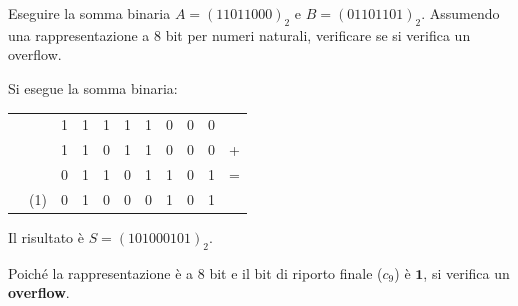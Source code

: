 \begin{Exercise}[label={ex:somma_overflow}]
    Eseguire la somma binaria $A = (11011000)_{2}$ e $B = (01101101)_{2}$. Assumendo una rappresentazione a 8 bit per numeri naturali, verificare se si verifica un overflow.
\end{Exercise}

\begin{Answer}[ref={ex:somma_overflow}]
    Si esegue la somma binaria:
    \begin{table}[H]
    \centering
    \begin{tabular}{ccccccccccc}
            &      & 1 & 1 & 1 & 1 & 1 & 0 & 0 & 0 & \\
            &      & 1 & 1 & 0 & 1 & 1 & 0 & 0 & 0 &+\\
            &      & 0 & 1 & 1 & 0 & 1 & 1 & 0 & 1 &=\\
            \hline
            &(1)& 0 & 1 & 0 & 0 & 0 & 1 & 0 & 1 &\\
    \end{tabular}
    \end{table}
    Il risultato è $S = (101000101)_{2}$.

    Poiché la rappresentazione è a 8 bit e il bit di riporto finale ($c_9$) è $\mathbf{1}$, si verifica un \textbf{overflow}.
\end{Answer}
